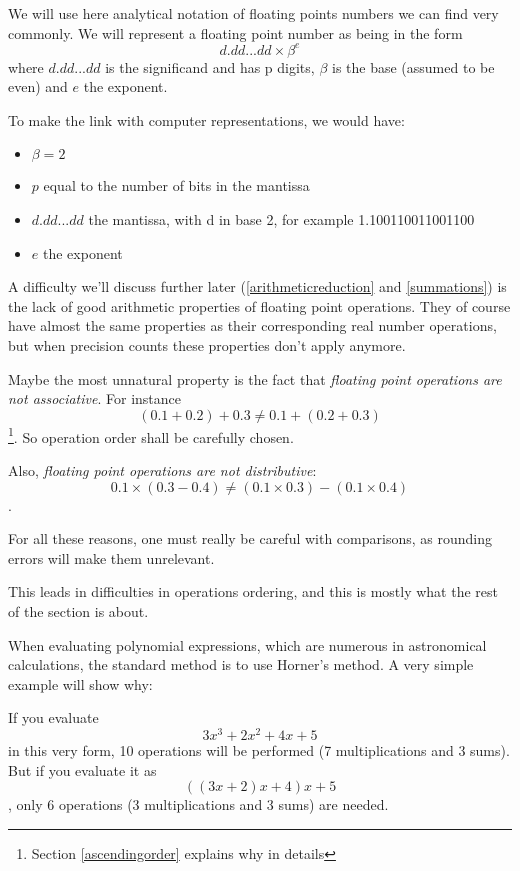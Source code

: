 
We will use here analytical notation of floating points numbers we can find very commonly. We will represent a floating point number as being in the form $$d.dd...dd\times\beta^e$$where $d.dd...dd$ is the significand and has p digits, $\beta$ is the base (assumed to be even) and $e$ the exponent.

To make the link with computer representations, we would have:
\begin{itemize}
\item $\beta=2$
\item $p$ equal to the number of bits in the mantissa
\item $d.dd...dd$ the mantissa, with d in base 2, for example 1.100110011001100
\item $e$ the exponent
\end{itemize}


A difficulty we'll discuss further later (\ref{arithmeticreduction} and \ref{summations}) is the lack of good arithmetic properties of floating point operations. They of course have almost the same properties as their corresponding real number operations, but when precision counts these properties don't apply anymore.

Maybe the most unnatural property is the fact that \emph{floating point operations are not associative}. For instance $$(0.1 + 0.2) + 0.3 \neq 0.1 + (0.2 + 0.3)$$\footnote{Section \ref{ascendingorder} explains why in details}. So operation order shall be carefully chosen.

Also, \emph{floating point operations are not distributive}: $$0.1 \times (0.3 - 0.4) \neq (0.1 \times 0.3) - (0.1 \times 0.4)$$.

For all these reasons, one must really be careful with comparisons, as rounding errors will make them unrelevant.

This leads in difficulties in operations ordering, and this is mostly what the rest of the section is about.


When evaluating polynomial expressions, which are numerous in astronomical calculations, the standard method is to use Horner's method. A very simple example will show why:

If you evaluate $$3x^3 + 2x^2 + 4x + 5$$ in this very form, 10 operations will be performed (7 multiplications and 3 sums). But if you evaluate it as $$((3x + 2)x + 4)x + 5$$, only 6 operations (3 multiplications and 3 sums) are needed.

